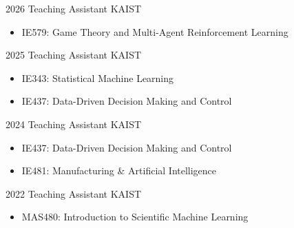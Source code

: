 \documentclass[10pt]{developercv} %
\begin{document}
\begin{entrylist}
    \entry
        {2026}
        {Teaching Assistant}
        {KAIST}
        {\vspace{-5pt}
        \begin{itemize}[noitemsep,topsep=0pt,parsep=2pt,partopsep=0pt, leftmargin=0pt]
            \item[] IE579: Game Theory and Multi-Agent Reinforcement Learning
        \end{itemize}
        }
    \entry
        {2025}
        {Teaching Assistant}
        {KAIST}
        {\vspace{-5pt}
        \begin{itemize}[noitemsep,topsep=0pt,parsep=2pt,partopsep=0pt, leftmargin=0pt]
            \item[] IE343: Statistical Machine Learning
            \item[] IE437: Data-Driven Decision Making and Control
        \end{itemize}
        }
    \entry
        {2024}
        {Teaching Assistant}
        {KAIST}
        {\vspace{-5pt}
        \begin{itemize}[noitemsep,topsep=0pt,parsep=2pt,partopsep=0pt, leftmargin=0pt]
            \item[] IE437: Data-Driven Decision Making and Control
            \item[] IE481: Manufacturing \& Artificial Intelligence
        \end{itemize}
        }
    \entry
        {2022}
        {Teaching Assistant}
        {KAIST}
        {\vspace{-5pt}
        \begin{itemize}[noitemsep,topsep=0pt,parsep=2pt,partopsep=0pt, leftmargin=0pt]
            \item[] MAS480: Introduction to Scientific Machine Learning
        \end{itemize}
        }
\end{entrylist}

\end{document}
